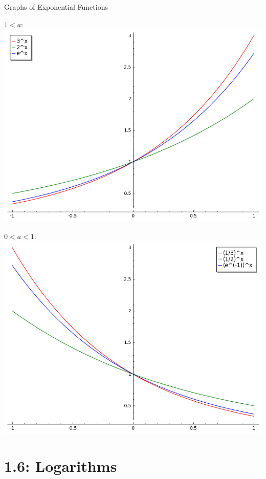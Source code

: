\documentclass{beamer}
\theoremstyle{definition}
\begin{document}
\begin{frame}{Graphs of Exponential Functions}
  \noindent
  \begin{multicols}{2}
    \begin{center}
      $1 < a$:
      \includegraphics[scale=0.25]{imgs/exponentials1.png}
    \end{center}
    \columnbreak
    \begin{center}
      $0 < a < 1$:
      \includegraphics[scale=0.25]{imgs/exponentials2.png}
    \end{center}
  \end{multicols}
\end{frame}

\section{1.6: Logarithms}
\end{document}
